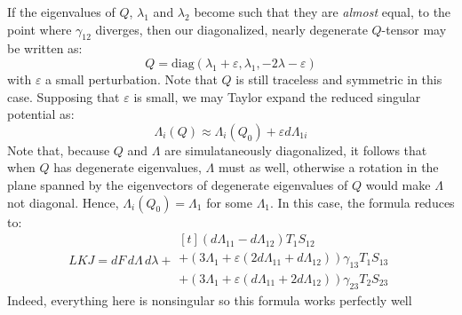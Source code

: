 \documentclass[reqno]{article}
\begin{document}
  If the eigenvalues of $Q$, $\lambda_1$ and $\lambda_2$ become such that they
  are \textit{almost} equal, to the point where $\gamma_{12}$ diverges, then our
  diagonalized, nearly degenerate $Q$-tensor may be written as:
  \begin{equation}
    Q = \text{diag}(\lambda_1 + \varepsilon, \lambda_1, -2\lambda - \varepsilon)
  \end{equation}
  with $\varepsilon$ a small perturbation.
  Note that $Q$ is still traceless and symmetric in this case.
  Supposing that $\varepsilon$ is small, we may Taylor expand the reduced
  singular potential as:
  \begin{equation}
    \Lambda_i(Q)
    \approx
    \Lambda_i(Q_0) + \varepsilon d\Lambda_{1i} 
  \end{equation}
  Note that, because $Q$ and $\Lambda$ are simulataneously diagonalized, it
  follows that when $Q$ has degenerate eigenvalues, $\Lambda$ must as well,
  otherwise a rotation in the plane spanned by the eigenvectors of degenerate
  eigenvalues of $Q$ would make $\Lambda$ not diagonal.
  Hence, $\Lambda_i(Q_0) = \Lambda_1$ for some $\Lambda_1$.
  In this case, the formula reduces to:
  \begin{equation}
    LKJ
    =
    dF \, d\Lambda \, d\lambda
    +
    \begin{multlined}[t]
      \left( d\Lambda_{11} - d\Lambda_{12} \right) T_1 S_{12} \\
      + \left( 3 \Lambda_1 + \varepsilon \left( 2 d\Lambda_{11} + d\Lambda_{12} \right) \right) \gamma_{13} T_1 S_{13} \\
      + \left( 3 \Lambda_1 + \varepsilon \left( d \Lambda_{11} + 2 d\Lambda_{12} \right) \right) \gamma_{23} T_2 S_{23}
    \end{multlined}
  \end{equation}
  Indeed, everything here is nonsingular so this formula works perfectly well
  

	
\end{document}

